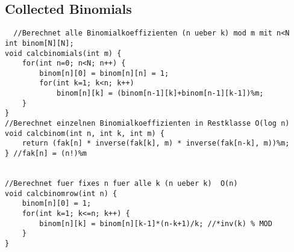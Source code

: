 \subsection{Collected Binomials}

\begin{lstlisting}
  //Berechnet alle Binomialkoeffizienten (n ueber k) mod m mit n<N
int binom[N][N];
void calcbinomials(int m) {
	for(int n=0; n<N; n++) {
		binom[n][0] = binom[n][n] = 1;
		for(int k=1; k<n; k++)
			binom[n][k] = (binom[n-1][k]+binom[n-1][k-1])%m;
	}
}
//Berechnet einzelnen Binomialkoeffizienten in Restklasse O(log n)
void calcbinom(int n, int k, int m) {
	return (fak[n] * inverse(fak[k], m) * inverse(fak[n-k], m))%m;
} //fak[n] = (n!)%m


//Berechnet fuer fixes n fuer alle k (n ueber k)  O(n)
void calcbinomrow(int n) {
	binom[n][0] = 1;
	for(int k=1; k<=n; k++) {
		binom[n][k] = binom[n][k-1]*(n-k+1)/k; //*inv(k) % MOD
	}
}
\end{lstlisting}
